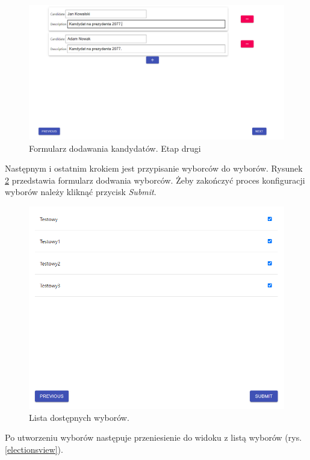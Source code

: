 \documentclass[a4paper,12pt]{book}
\begin{document}
\begin{figure}[h]
	\centering
	\includegraphics[width=\textwidth]{images/votescandidate.png}
	\caption{Formularz dodawania kandydatów. Etap drugi}\label{votescandidate}
\end {figure}

Następnym i ostatnim krokiem jest przypisanie wyborców do wyborów. Rysunek \ref{choosevoters} przedstawia formularz dodwania wyborców. Żeby zakończyć proces konfiguracji wyborów należy kliknąć przycisk \textit{Submit}.

\begin{figure}[H]
	\centering
	\includegraphics[width=\textwidth]{images/choosevoters.png}
	\caption{Lista dostępnych wyborów.}\label{choosevoters}
\end {figure}

Po utworzeniu wyborów następuje przeniesienie do widoku z listą wyborów (rys. \ref{electionsview}).
\end{document}
